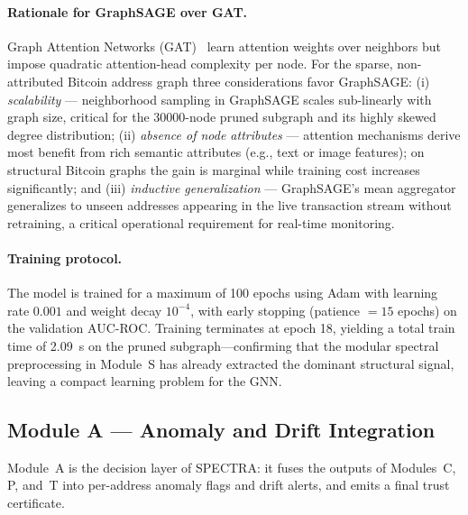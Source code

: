 \documentclass[journal]{IEEEtran}
\begin{document}
\paragraph{Rationale for GraphSAGE over GAT.}
Graph Attention Networks (GAT)~\cite{Velickovic2018} learn attention
weights over neighbors but impose quadratic attention-head complexity per
node.
For the sparse, non-attributed Bitcoin address graph three considerations
favor GraphSAGE: (i) \emph{scalability} — neighborhood sampling in GraphSAGE
scales sub-linearly with graph size, critical for the \num{30000}-node pruned
subgraph and its highly skewed degree distribution; (ii) \emph{absence of
node attributes} — attention mechanisms derive most benefit from rich semantic
attributes (e.g., text or image features); on structural Bitcoin graphs the
gain is marginal while training cost increases significantly; and (iii)
\emph{inductive generalization} — GraphSAGE's mean aggregator generalizes to
unseen addresses appearing in the live transaction stream without retraining,
a critical operational requirement for real-time monitoring.

\paragraph{Training protocol.}
The model is trained for a maximum of 100 epochs using Adam with learning
rate $0.001$ and weight decay $10^{-4}$, with early stopping
(patience $= 15$ epochs) on the validation AUC-ROC.
Training terminates at epoch 18, yielding a total train time of
\SI{2.09}{\second} on the pruned subgraph—confirming that the modular
spectral preprocessing in Module~S has already extracted the dominant
structural signal, leaving a compact learning problem for the GNN.

\subsection{Module A — Anomaly and Drift Integration}
\label{sec:module_a}

Module~A is the decision layer of \textsc{SPECTRA}: it fuses the outputs of
Modules~C, P, and~T into per-address anomaly flags and drift alerts,
and emits a final trust certificate.
\end{document}
